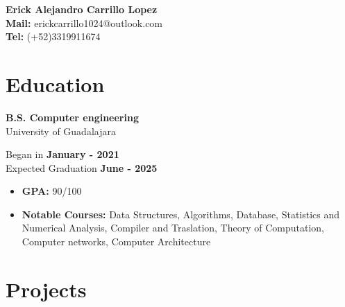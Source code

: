 \documentclass[11pt]{article}
\begin{document}
 \thispagestyle{empty}
\begin{center}
\Large{\textbf{Erick Alejandro Carrillo Lopez} \\
  \textbf{Mail:} erickcarrillo1024@outlook.com\\
  \textbf{Tel:} (+52)3319911674}
\quad\quad \href{https://github.com/alecksandr26}{\color{blue}{Github}}
  \quad\quad \href{https://www.linkedin.com/in/erick-alejandro-carrillo-lopez-988112219/}{\color{blue}{Linkedin}}
\end{center}
\vspace{-0.5cm}
\section*{Education}
\vspace{-0.4cm}
\titlerule[0.3pt]
\vspace{-0.4cm}

\begin{multicols}{2}
  \noindent
  \textbf{B.S. Computer engineering}\\
  University of Guadalajara
  
  \columnbreak
  \noindent
  Began in \textbf{January - 2021}\\
  Expected Graduation \textbf{June -  2025}
\end{multicols}
\vspace{-0.3cm}
\begin{itemize}[noitemsep, nolistsep]
\item \textbf{GPA:} 90/100
\item \textbf{Notable Courses:} Data Structures, Algorithms, Database, Statistics and Numerical Analysis,
  Compiler and Traslation, Theory of Computation, Computer networks, Computer Architecture
\end{itemize}
\vspace{-0.4cm}
\section*{Projects}
\vspace{-0.4cm}
\titlerule[0.3pt]
\vspace{0.1cm}
\end{document}
